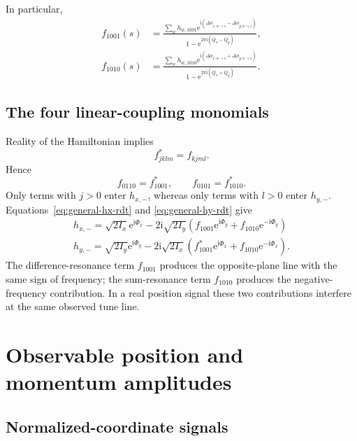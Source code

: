 \documentclass[11pt,a4paper]{article}
\newcommand{\ii}{\mathrm{i}}
\newcommand{\e}{\mathrm{e}}
\newcommand{\fminus}{f_{1001}}
\newcommand{\fplus}{f_{1010}}
\begin{document}
In particular,
\begin{align}
 f_{1001}(s)&=
 \frac{\displaystyle\sum_w h_{w,1001}
 \e^{\ii(\Delta\phi_{x,w\to s}-\Delta\phi_{y,w\to s})}}
 {1-\e^{2\pi\ii(Q_x-Q_y)}},
 \label{eq:f1001-source}\\
 f_{1010}(s)&=
 \frac{\displaystyle\sum_w h_{w,1010}
 \e^{\ii(\Delta\phi_{x,w\to s}+\Delta\phi_{y,w\to s})}}
 {1-\e^{2\pi\ii(Q_x+Q_y)}}.
 \label{eq:f1010-source}
\end{align}

\subsection{The four linear-coupling monomials}

Reality of the Hamiltonian implies
\begin{equation}
 f_{jklm}^{*}=f_{kjml}.
\end{equation}
Hence
\begin{equation}
 \boxed{
 f_{0110}=f_{1001}^{*},
 \qquad
 f_{0101}=f_{1010}^{*}.
 }
 \label{eq:rdt-conjugates}
\end{equation}
Only terms with $j>0$ enter $h_{x,-}$, whereas only terms with $l>0$ enter
$h_{y,-}$.  Equations~\eqref{eq:general-hx-rdt} and
\eqref{eq:general-hy-rdt} give
\begin{align}
 \boxed{
 h_{x,-}=\sqrt{2I_x}\e^{\ii\Phi_x}
 -2\ii\sqrt{2I_y}
 \left(\fminus\e^{\ii\Phi_y}+\fplus\e^{-\ii\Phi_y}\right)
 }
 \label{eq:hx-linear-coupling}\\
 \boxed{
 h_{y,-}=\sqrt{2I_y}\e^{\ii\Phi_y}
 -2\ii\sqrt{2I_x}
 \left(\fminus^{*}\e^{\ii\Phi_x}+\fplus\e^{-\ii\Phi_x}\right).
 }
 \label{eq:hy-linear-coupling}
\end{align}
The difference-resonance term $f_{1001}$ produces the opposite-plane line with the same sign of frequency; the sum-resonance term $f_{1010}$ produces the negative-frequency contribution.  In a real position signal these two contributions interfere at the same observed tune line.

\section{Observable position and momentum amplitudes}
\label{sec:observables}

\subsection{Normalized-coordinate signals}
\end{document}
